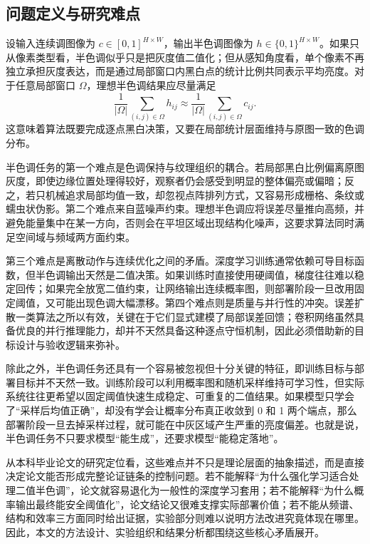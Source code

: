 \documentclass[thesis]{../zstucs-graduation-project}
\begin{document}
\subsection{问题定义与研究难点}
设输入连续调图像为 $c\in[0,1]^{H\times W}$，输出半色调图像为 $h\in\{0,1\}^{H\times W}$。如果只从像素类型看，半色调似乎只是把灰度值二值化；但从感知角度看，单个像素不再独立承担灰度表达，而是通过局部窗口内黑白点的统计比例共同表示平均亮度。对于任意局部窗口 $\Omega$，理想半色调结果应尽量满足
\begin{equation}
\frac{1}{|\Omega|}\sum_{(i,j)\in\Omega} h_{ij} \approx \frac{1}{|\Omega|}\sum_{(i,j)\in\Omega} c_{ij}.
\label{eq:1-1}
\end{equation}
这意味着算法既要完成逐点黑白决策，又要在局部统计层面维持与原图一致的色调分布。

半色调任务的第一个难点是色调保持与纹理组织的耦合。若局部黑白比例偏离原图灰度，即使边缘位置处理得较好，观察者仍会感受到明显的整体偏亮或偏暗；反之，若只机械追求局部均值一致，却忽视点阵排列方式，又容易形成栅格、条纹或蠕虫状伪影。第二个难点来自蓝噪声约束。理想半色调应将误差尽量推向高频，并避免能量集中在某一方向，否则会在平坦区域出现结构化噪声，这要求算法同时满足空间域与频域两方面约束\cite{ULICHNEY1988Dithering}。

第三个难点是离散动作与连续优化之间的矛盾。深度学习训练通常依赖可导目标函数，但半色调输出天然是二值决策。如果训练时直接使用硬阈值，梯度往往难以稳定回传；如果完全放宽二值约束，让网络输出连续概率图，则部署阶段一旦改用固定阈值，又可能出现色调大幅漂移。第四个难点则是质量与并行性的冲突。误差扩散一类算法之所以有效，关键在于它们显式建模了局部误差回馈；卷积网络虽然具备优良的并行推理能力，却并不天然具备这种逐点守恒机制，因此必须借助新的目标设计与验收逻辑来弥补。

除此之外，半色调任务还具有一个容易被忽视但十分关键的特征，即训练目标与部署目标并不天然一致。训练阶段可以利用概率图和随机采样维持可学习性，但实际系统往往更希望以固定阈值快速生成稳定、可重复的二值结果。如果模型只学会了“采样后均值正确”，却没有学会让概率分布真正收敛到 0 和 1 两个端点，那么部署阶段一旦去掉采样过程，就可能在中灰区域产生严重的亮度偏差。也就是说，半色调任务不只要求模型“能生成”，还要求模型“能稳定落地”。

从本科毕业论文的研究定位看，这些难点并不只是理论层面的抽象描述，而是直接决定论文能否形成完整论证链条的控制问题。若不能解释“为什么强化学习适合处理二值半色调”，论文就容易退化为一般性的深度学习套用；若不能解释“为什么概率输出最终能安全阈值化”，论文结论又很难支撑实际部署价值；若不能从频谱、结构和效率三方面同时给出证据，实验部分则难以说明方法改进究竟体现在哪里。因此，本文的方法设计、实验组织和结果分析都围绕这些核心矛盾展开。
\end{document}
